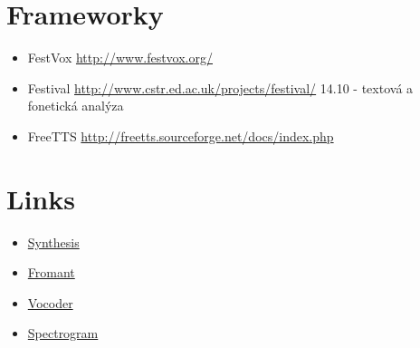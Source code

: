 \documentclass{article}
\begin{document}
\section*{Frameworky}
\begin{itemize}
\item FestVox \url{http://www.festvox.org/}
\item Festival \url{http://www.cstr.ed.ac.uk/projects/festival/}
\cite{huang2001spoken} 14.10 - textová a fonetická analýza
\item FreeTTS \url{http://freetts.sourceforge.net/docs/index.php}
\end{itemize}
\section*{Links}
\begin{itemize}
\item\href{https://en.wikipedia.org/wiki/Speech_synthesis}{Synthesis}
\item\href{https://en.wikipedia.org/wiki/Formant}{Fromant}
\item\href{https://en.wikipedia.org/wiki/Vocoder}{Vocoder}
\item\href{https://en.wikipedia.org/wiki/Spectrogram}{Spectrogram}
\end{itemize}


\end{document}

